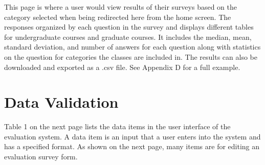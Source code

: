 \documentclass{article}
\begin{document}
This page is where a user would view results of their surveys based on the category selected when being redirected here from the home screen.  The responses organized by each question in the survey and displays different tables for undergraduate courses and graduate courses. It includes the median, mean, standard deviation, and number of answers for each question along with statistics on the question for categories the classes are included in. The results can also be downloaded and exported as a .csv file. See Appendix D for a full example.

\section{Data Validation}

Table 1 on the next page lists the data items in the user interface of the evaluation system. A data item is an input that a user enters into the system and has a specified format. As shown on the next page, many items are for editing an evaluation survey form.
\end{document}
